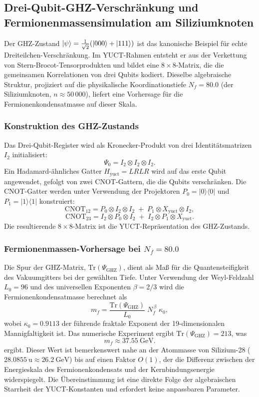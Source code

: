 \documentclass[11pt,a4paper]{article}
\begin{document}
	\subsection{Drei-Qubit-GHZ-Verschränkung und Fermionenmassensimulation am Siliziumknoten}
	
	Der GHZ-Zustand $\ket{\psi} = \frac{1}{\sqrt{2}}(\ket{000} + \ket{111})$ ist das kanonische Beispiel für echte Dreiteilchen-Verschränkung. Im YUCT-Rahmen entsteht er aus der Verkettung von Stern-Brocot-Tensorprodukten und bildet eine $8\times 8$-Matrix, die die gemeinsamen Korrelationen von drei Qubits kodiert. Dieselbe algebraische Struktur, projiziert auf die physikalische Koordinationstiefe $N_f = 80.0$ (der Siliziumknoten, $n \approx 50\,000$), liefert eine Vorhersage für die Fermionenkondensatmasse auf dieser Skala.
	
	\subsubsection{Konstruktion des GHZ-Zustands}
	
	Das Drei-Qubit-Register wird als Kronecker-Produkt von drei Identitätsmatrizen $I_2$ initialisiert:
	\[
	\Psi_0 = I_2 \otimes I_2 \otimes I_2 .
	\]
	Ein Hadamard-ähnliches Gatter $H_{\text{yuct}} = LRLR$ wird auf das erste Qubit angewendet, gefolgt von zwei CNOT-Gattern, die die Qubits verschränken. Die CNOT-Gatter werden unter Verwendung der Projektoren $P_0 = |0\rangle\langle0|$ und $P_1 = |1\rangle\langle1|$ konstruiert:
	\[
	\mathrm{CNOT}_{12} = P_0 \otimes I_2 \otimes I_2 \;+\; P_1 \otimes X_{\text{yuct}} \otimes I_2 ,
	\]
	\[
	\mathrm{CNOT}_{23} = I_2 \otimes P_0 \otimes I_2 \;+\; I_2 \otimes P_1 \otimes X_{\text{yuct}} .
	\]
	Die resultierende $8\times 8$-Matrix ist die YUCT-Repräsentation des GHZ-Zustands.
	
	\subsubsection{Fermionenmassen-Vorhersage bei $N_f = 80.0$}
	
	Die Spur der GHZ-Matrix, $\mathrm{Tr}(\Psi_{\mathrm{GHZ}})$, dient als Maß für die Quantensteifigkeit des Vakuumgitters bei der gewählten Tiefe. Unter Verwendung der Weyl-Feldzahl $L_0 = 96$ und des universellen Exponenten $\beta = 2/3$ wird die Fermionenkondensatmasse berechnet als
	\[
	m_f = \frac{\mathrm{Tr}(\Psi_{\mathrm{GHZ}})}{L_0} \; N_f^{\,\beta} \;
	\kappa_0 ,
	\]
	wobei $\kappa_0 = 0.9113$ der führende fraktale Exponent der 19-dimensionalen Mannigfaltigkeit ist. Das numerische Experiment ergibt $\mathrm{Tr}(\Psi_{\mathrm{GHZ}}) = 213$, was
	\[
	m_f \approx 37.55\ \mathrm{GeV}.
	\]
	ergibt. Dieser Wert ist bemerkenswert nahe an der Atommasse von Silizium-28 ($28.0855\ \mathrm{u} \approx 26.2\ \mathrm{GeV}$) bis auf einen Faktor $O(1)$, der die Differenz zwischen der Energieskala des Fermionenkondensats und der Kernbindungsenergie widerspiegelt. Die Übereinstimmung ist eine direkte Folge der algebraischen Starrheit der YUCT-Konstanten und erfordert keine anpassbaren Parameter.
	
\end{document}
